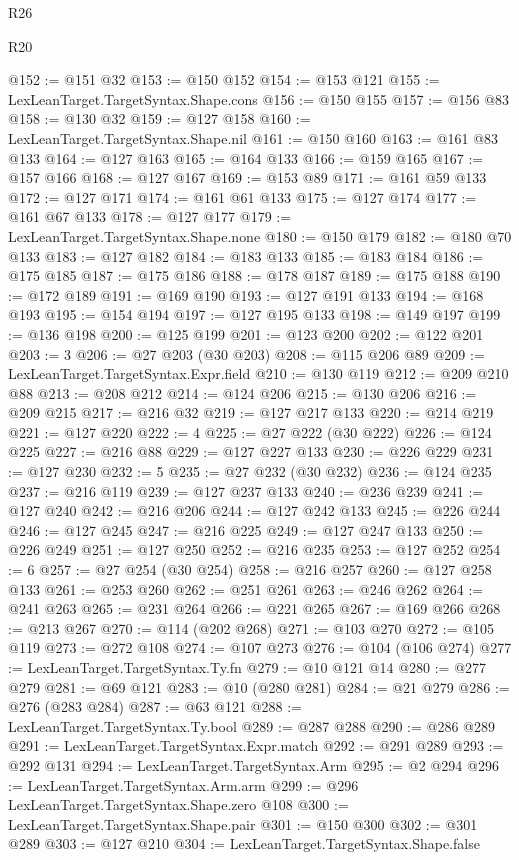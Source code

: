 \begin{lexlean}{R26}
\begin{lexlean}{R20}
\begin{coremodule}
{{{{{{{{{{{{{{{{{{{{{{{{{{{{{{{{{{{{{{{{{{{{{{{{{{{{{{{{{{{{{{{@152 := @151 @32
@153 := @150 @152
@154 := @153 @121
@155 := LexLeanTarget.TargetSyntax.Shape.cons
@156 := @150 @155
@157 := @156 @83
@158 := @130 @32
@159 := @127 @158
@160 := LexLeanTarget.TargetSyntax.Shape.nil
@161 := @150 @160
@163 := @161 @83 @133
@164 := @127 @163
@165 := @164 @133
@166 := @159 @165
@167 := @157 @166
@168 := @127 @167
@169 := @153 @89
@171 := @161 @59 @133
@172 := @127 @171
@174 := @161 @61 @133
@175 := @127 @174
@177 := @161 @67 @133
@178 := @127 @177
@179 := LexLeanTarget.TargetSyntax.Shape.none
@180 := @150 @179
@182 := @180 @70 @133
@183 := @127 @182
@184 := @183 @133
@185 := @183 @184
@186 := @175 @185
@187 := @175 @186
@188 := @178 @187
@189 := @175 @188
@190 := @172 @189
@191 := @169 @190
@193 := @127 @191 @133
@194 := @168 @193
@195 := @154 @194
@197 := @127 @195 @133
@198 := @149 @197
@199 := @136 @198
@200 := @125 @199
@201 := @123 @200
@202 := @122 @201
@203 := 3
@206 := @27 @203 (@30 @203)
@208 := @115 @206 @89
@209 := LexLeanTarget.TargetSyntax.Expr.field
@210 := @130 @119
@212 := @209 @210 @88
@213 := @208 @212
@214 := @124 @206
@215 := @130 @206
@216 := @209 @215
@217 := @216 @32
@219 := @127 @217 @133
@220 := @214 @219
@221 := @127 @220
@222 := 4
@225 := @27 @222 (@30 @222)
@226 := @124 @225
@227 := @216 @88
@229 := @127 @227 @133
@230 := @226 @229
@231 := @127 @230
@232 := 5
@235 := @27 @232 (@30 @232)
@236 := @124 @235
@237 := @216 @119
@239 := @127 @237 @133
@240 := @236 @239
@241 := @127 @240
@242 := @216 @206
@244 := @127 @242 @133
@245 := @226 @244
@246 := @127 @245
@247 := @216 @225
@249 := @127 @247 @133
@250 := @226 @249
@251 := @127 @250
@252 := @216 @235
@253 := @127 @252
@254 := 6
@257 := @27 @254 (@30 @254)
@258 := @216 @257
@260 := @127 @258 @133
@261 := @253 @260
@262 := @251 @261
@263 := @246 @262
@264 := @241 @263
@265 := @231 @264
@266 := @221 @265
@267 := @169 @266
@268 := @213 @267
@270 := @114 (@202 @268)
@271 := @103 @270
@272 := @105 @119
@273 := @272 @108
@274 := @107 @273
@276 := @104 (@106 @274)
@277 := LexLeanTarget.TargetSyntax.Ty.fn
@279 := @10 @121 @14
@280 := @277 @279
@281 := @69 @121
@283 := @10 (@280 @281)
@284 := @21 @279
@286 := @276 (@283 @284)
@287 := @63 @121
@288 := LexLeanTarget.TargetSyntax.Ty.bool
@289 := @287 @288
@290 := @286 @289
@291 := LexLeanTarget.TargetSyntax.Expr.match
@292 := @291 @289
@293 := @292 @131
@294 := LexLeanTarget.TargetSyntax.Arm
@295 := @2 @294
@296 := LexLeanTarget.TargetSyntax.Arm.arm
@299 := @296 LexLeanTarget.TargetSyntax.Shape.zero @108
@300 := LexLeanTarget.TargetSyntax.Shape.pair
@301 := @150 @300
@302 := @301 @289
@303 := @127 @210
@304 := LexLeanTarget.TargetSyntax.Shape.false
}}}}}}}}}}}}}}}}}}}}}}}}}}}}}}}}}}}}}}}}}}}}}}}}}}}}}}}}}}}}}}}
\end{coremodule}
\end{lexlean}
\end{lexlean}
